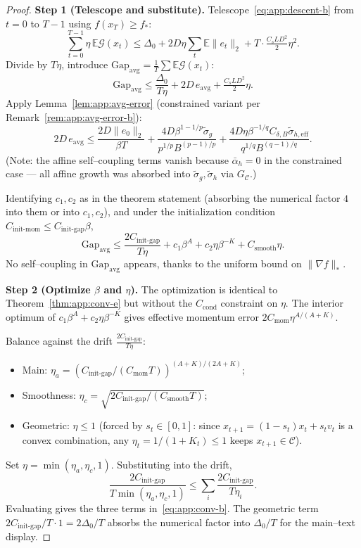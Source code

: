 \documentclass{article}
\theoremstyle{plain}
\theoremstyle{definition}
\theoremstyle{remark}
\begin{document}
\begin{proof}
\smallskip\noindent\textbf{Step 1 (Telescope and substitute).}
Telescope~\eqref{eq:app:descent-b} from $t = 0$ to $T-1$ using $f(x_T)
\geq f_*$:
\[
  \sum_{t=0}^{T-1}\eta\, \mathbb{E}\mathcal{G}(x_t)
  \leq \Delta_0 + 2D\eta\sum_t \mathbb{E}\|e_t\|_2 + T\cdot \tfrac{C_s L D^2}{2}\eta^2.
\]
Divide by $T\eta$, introduce $\mathrm{Gap}_{\mathrm{avg}} = \tfrac1T\sum
\mathbb{E}\mathcal{G}(x_t)$:
\[
  \mathrm{Gap}_{\mathrm{avg}}
  \leq \frac{\Delta_0}{T\eta} + 2D\, e_{\mathrm{avg}}
    + \tfrac{C_s L D^2}{2}\eta.
\]
Apply Lemma~\ref{lem:app:avg-error} (constrained variant per
Remark~\ref{rem:app:avg-error-b}):
\[
  2D\, e_{\mathrm{avg}}
  \leq \frac{2D\|e_0\|_2}{\beta T}
    + \frac{4D\beta^{1-1/p}\tilde\sigma_g}{p^{1/p} B^{(p-1)/p}}
    + \frac{4D\eta\beta^{-1/q} C_{\delta,B}\tilde\sigma_{h,\mathrm{eff}}}{q^{1/q} B^{(q-1)/q}}.
\]
(Note: the affine self--coupling terms vanish because $\bar\alpha_h = 0$
in the constrained case — all affine growth was absorbed into
$\tilde\sigma_g, \tilde\sigma_h$ via $G_\mathcal{C}$.)

Identifying $c_1, c_2$ as in the theorem statement (absorbing the
numerical factor $4$ into them or into $c_1, c_2$), and under the
initialization condition $C_{\mathrm{init\text{-}mom}} \leq
C_{\mathrm{init\text{-}gap}}\beta$,
\begin{equation}
  \mathrm{Gap}_{\mathrm{avg}}
  \leq \frac{2C_{\mathrm{init\text{-}gap}}}{T\eta}
    + c_1\beta^A + c_2\eta\beta^{-K}
    + C_{\mathrm{smooth}}\eta.
  \label{eq:app:b-master}
\end{equation}
No self--coupling in $\mathrm{Gap}_{\mathrm{avg}}$ appears, thanks to the
uniform bound on $\|\nabla f\|_*$.

\smallskip\noindent\textbf{Step 2 (Optimize $\beta$ and $\eta$).}
The optimization is identical to Theorem~\ref{thm:app:conv-e} but
without the $C_{\mathrm{cond}}$ constraint on $\eta$. The interior
optimum of $c_1\beta^A + c_2\eta\beta^{-K}$ gives effective momentum
error $2C_{\mathrm{mom}}\eta^{A/(A+K)}$.

Balance against the drift $\tfrac{2C_{\mathrm{init\text{-}gap}}}{T\eta}$:
\begin{itemize}[topsep=2pt,itemsep=0pt]
  \item Main: $\eta_a = (C_{\mathrm{init\text{-}gap}}/(C_{\mathrm{mom}} T))^{(A+K)/(2A+K)}$;
  \item Smoothness: $\eta_c = \sqrt{2C_{\mathrm{init\text{-}gap}}/(C_{\mathrm{smooth}} T)}$;
  \item Geometric: $\eta \leq 1$ (forced by $s_t \in [0,1]$: since
  $x_{t+1} = (1-s_t)x_t + s_t v_t$ is a convex combination, any $\eta_t
  = 1/(1+K_t) \leq 1$ keeps $x_{t+1} \in \mathcal{C}$).
\end{itemize}
Set $\eta = \min(\eta_a, \eta_c, 1)$. Substituting into the drift,
\[
  \frac{2C_{\mathrm{init\text{-}gap}}}{T\min(\eta_a,\eta_c, 1)}
  \leq \sum_i \frac{2C_{\mathrm{init\text{-}gap}}}{T\eta_i}.
\]
Evaluating gives the three terms in~\eqref{eq:app:conv-b}. The geometric
term $2C_{\mathrm{init\text{-}gap}}/T\cdot 1 = 2\Delta_0/T$ absorbs the
numerical factor into $\Delta_0/T$ for the main--text display.
\end{proof}
\end{document}
